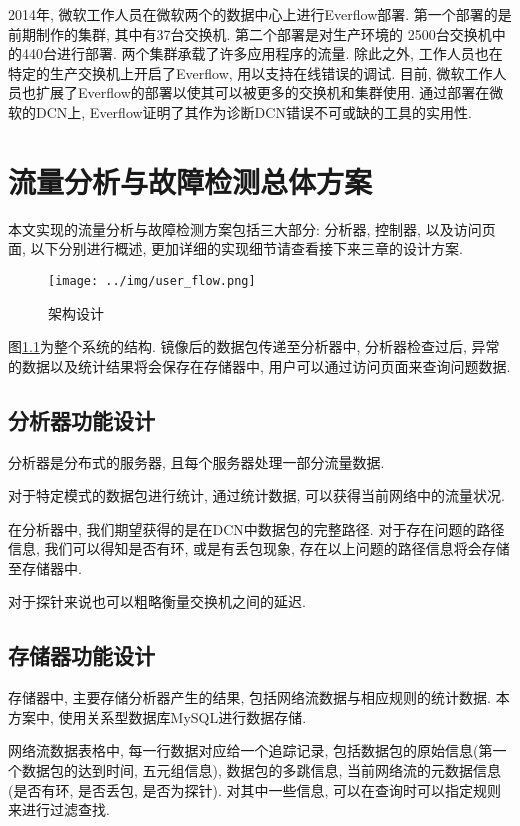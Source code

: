  2014年, 微软工作人员在微软两个的数据中心上进行Everflow部署.
第一个部署的是前期制作的集群, 其中有37台交换机. 第二个部署是对生产环境的
2500台交换机中的440台进行部署. 两个集群承载了许多应用程序的流量.
除此之外, 工作人员也在特定的生产交换机上开启了Everflow, 用以支持在线错误的调试.
目前, 微软工作人员也扩展了Everflow的部署以使其可以被更多的交换机和集群使用.
通过部署在微软的DCN上, Everflow证明了其作为诊断DCN错误不可或缺的工具的实用性.

\chapter{流量分析与故障检测总体方案}

本文实现的流量分析与故障检测方案包括三大部分: 分析器, 控制器, 以及访问页面, 以下分别进行概述,
更加详细的实现细节请查看接下来三章的设计方案.

\begin{figure}
  \centering
  \texttt{[image: ../img/user\_flow.png]}
  \caption{架构设计}
  \label{fig:arch}
\end{figure}

图\ref{fig:arch}为整个系统的结构. 镜像后的数据包传递至分析器中, 分析器检查过后,
异常的数据以及统计结果将会保存在存储器中, 用户可以通过访问页面来查询问题数据.

\section{分析器功能设计}

  分析器是分布式的服务器, 且每个服务器处理一部分流量数据.

  对于特定模式的数据包进行统计, 通过统计数据, 可以获得当前网络中的流量状况.

  在分析器中, 我们期望获得的是在DCN中数据包的完整路径. 对于存在问题的路径信息,
我们可以得知是否有环, 或是有丢包现象, 存在以上问题的路径信息将会存储至存储器中.

  对于探针来说也可以粗略衡量交换机之间的延迟.

\section{存储器功能设计}

存储器中, 主要存储分析器产生的结果, 包括网络流数据与相应规则的统计数据.
本方案中, 使用关系型数据库MySQL\cite{mysql}进行数据存储.

网络流数据表格中, 每一行数据对应给一个追踪记录,
包括数据包的原始信息(第一个数据包的达到时间, 五元组信息),
数据包的多跳信息, 当前网络流的元数据信息(是否有环, 是否丢包, 是否为探针).
对其中一些信息, 可以在查询时可以指定规则来进行过滤查找.

